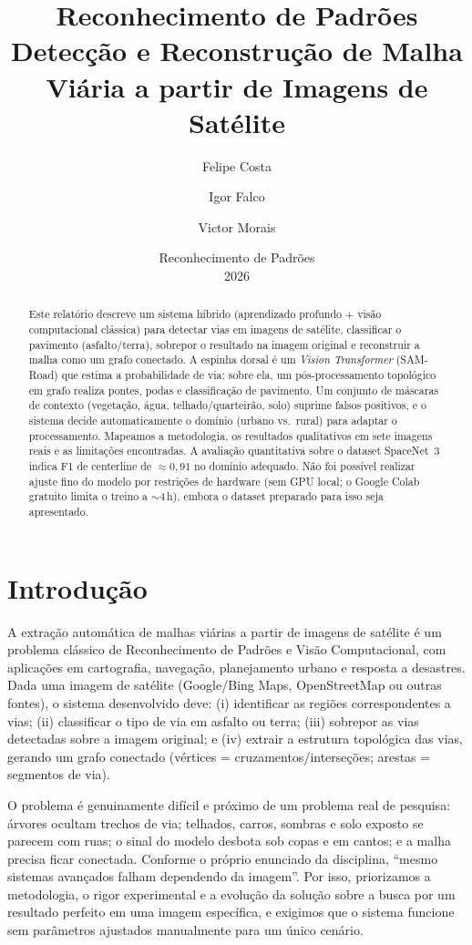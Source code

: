 \documentclass[12pt]{article}
\title{Reconhecimento de Padrões \\ Detecção e Reconstrução de Malha Viária a partir de Imagens de Satélite}
\author{Felipe Costa \and Igor Falco \and Victor Morais}
\date{Reconhecimento de Padrões \\ 2026}
\begin{document}
\maketitle

\begin{abstract}
\noindent Este relatório descreve um sistema híbrido (aprendizado profundo +
visão computacional clássica) para detectar vias em imagens de satélite,
classificar o pavimento (asfalto/terra), sobrepor o resultado na imagem
original e reconstruir a malha como um grafo conectado. A espinha
dorsal é um \textit{Vision Transformer} (SAM-Road) que estima a probabilidade
de via; sobre ela, um pós-processamento topológico em grafo realiza pontes,
podas e classificação de pavimento. Um conjunto de máscaras de
contexto (vegetação, água, telhado/quarteirão, solo) suprime falsos positivos,
e o sistema decide automaticamente o domínio (urbano vs.\ rural) para
adaptar o processamento. Mapeamos a metodologia, os resultados qualitativos
em sete imagens reais e as limitações encontradas. A avaliação quantitativa
sobre o dataset SpaceNet~3 indica F1 de centerline de $\approx0{,}91$ no
domínio adequado. Não foi possível realizar ajuste fino do modelo por
restrições de hardware (sem GPU local; o Google Colab gratuito limita o treino
a $\sim$4\,h), embora o dataset preparado para isso seja apresentado.
\end{abstract}

\section{Introdução}

A extração automática de malhas viárias a partir de imagens de satélite é um
problema clássico de Reconhecimento de Padrões e Visão Computacional, com
aplicações em cartografia, navegação, planejamento urbano e resposta a
desastres. Dada uma imagem de satélite (Google/Bing Maps, OpenStreetMap ou
outras fontes), o sistema desenvolvido deve: (i) identificar as regiões
correspondentes a vias; (ii) classificar o tipo de via em asfalto ou
terra; (iii) sobrepor as vias detectadas sobre a imagem original; e
(iv) extrair a estrutura topológica das vias, gerando um grafo conectado
(vértices = cruzamentos/interseções; arestas = segmentos de via).

O problema é genuinamente difícil e próximo de um problema real de pesquisa:
árvores ocultam trechos de via; telhados, carros, sombras e solo exposto se
parecem com ruas; o sinal do modelo desbota sob copas e em cantos; e a malha
precisa ficar conectada. Conforme o próprio enunciado da disciplina,
``mesmo sistemas avançados falham dependendo da imagem''. Por isso, priorizamos
a metodologia, o rigor experimental e a evolução da solução sobre a
busca por um resultado perfeito em uma imagem específica, e exigimos que o
sistema funcione sem parâmetros ajustados manualmente para um único
cenário.
\end{document}
